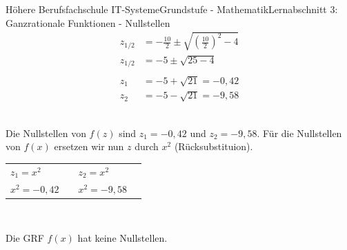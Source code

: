 \documentclass[11pt,twocolumn,oneside,openany,headings=optiontotoc,11pt,numbers=noenddot]{article}
\begin{document}
\begin{worksheet}{Höhere Berufsfachschule IT-Systeme}{Grundstufe - Mathematik}{Lernabschnitt 3: Ganzrationale Funktionen - Nullstellen}
\begin{align*}
		z_{1/2} & = -\frac{10}{2} \pm \sqrt{\left(\frac{10}{2}\right)^2 - 4}\\
		z_{1/2} & = -5 \pm \sqrt{25 - 4}\\
		\\
		z_1 & = -5 + \sqrt{21} = -0,42\\
		z_2 & = -5 - \sqrt{21} = -9,58
		\end{align*}\\
		\par\noindent
		Die Nullstellen von \(f(z)\) sind \(z_1=-0,42\) und \(z_2=-9,58\). Für die Nullstellen von \(f(x)\) ersetzen wir nun \(z\) durch \(x^2\) (Rücksubstituion).\\
		\par\noindent
		\begin{tabularx}{0.48\textwidth}{Ml|Ml}
			\(z_1 = x^2\) & & \(z_2 = x^2\) &\\
			\(x^2 = -0,42\) & \lightning & \(x^2 = -9,58\) & \lightning\\
		\end{tabularx}\\	
		\par\noindent
		Die GRF \(f(x)\) hat keine Nullstellen.\\

\end{worksheet}
\end{document}
